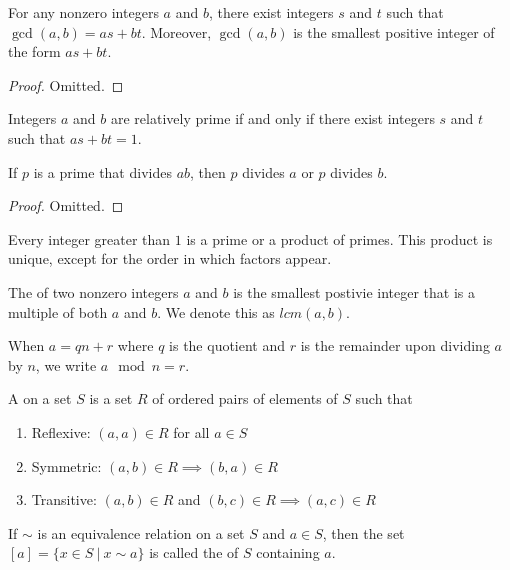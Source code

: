 \documentclass[12pt]{scrartcl}
\begin{document}
\begin{theorem}
  For any nonzero integers $a$ and $b$, there exist integers $s$ and $t$ such that $\gcd(a, b) = as + bt$. Moreover, 
  $\gcd(a, b)$ is the smallest positive integer of the form $as + bt$. 
  \begin{proof}
    Omitted. 
  \end{proof}
\end{theorem}

\begin{corollary}
  Integers $a$ and $b$ are relatively prime if and only if there exist integers $s$ and $t$ 
  such that $as + bt = 1$.  
\end{corollary}

\begin{lemma}
  If $p$ is a prime that divides $ab$, then $p$ divides $a$ or $p$ divides $b$. 
  \begin{proof}
    Omitted.
  \end{proof}
\end{lemma}

\begin{theorem}
  Every integer greater than $1$ is a prime or a product of primes. This product is unique, except for the 
  order in which factors appear. 
\end{theorem}

\begin{definition}
  The  of two nonzero integers $a$ and $b$ is the smallest postivie integer that is 
  a multiple of both $a$ and $b$. We denote this as $lcm(a, b)$. 
\end{definition}

\begin{definition}
  When $a = qn + r$ where $q$ is the quotient and $r$ is the remainder upon dividing $a$ by $n$, 
  we write $a \mod n = r$. 
\end{definition}

\begin{definition}
  A  on a set $S$ is a set $R$ of ordered pairs of elements of $S$ such that 
  \begin{enumerate}
    \item Reflexive: $(a, a) \in R$ for all $a \in S$
    \item Symmetric: $(a, b) \in R \implies (b, a) \in R$
    \item Transitive: $(a, b) \in R$ and $(b, c) \in R \implies (a,c) \in R$
  \end{enumerate}
  If $\sim$ is an equivalence relation on a set $S$ and $a \in S$, then the set $[a] = \{x \in S \ | \ x \sim a\}$ is called 
  the  of $S$ containing $a$. 
\end{definition}
\end{document}
